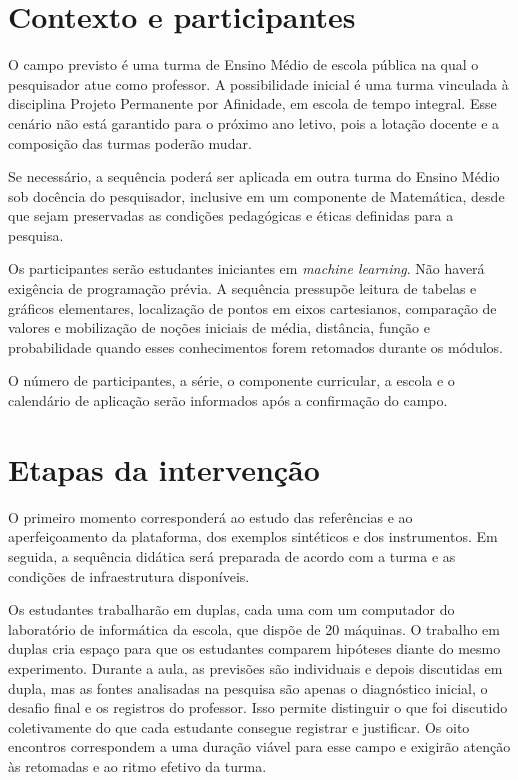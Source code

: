 \section{Contexto e participantes}

O campo previsto é uma turma de Ensino Médio de escola pública na qual o pesquisador atue como professor. A possibilidade inicial é uma turma vinculada à disciplina Projeto Permanente por Afinidade, em escola de tempo integral. Esse cenário não está garantido para o próximo ano letivo, pois a lotação docente e a composição das turmas poderão mudar.

Se necessário, a sequência poderá ser aplicada em outra turma do Ensino Médio sob docência do pesquisador, inclusive em um componente de Matemática, desde que sejam preservadas as condições pedagógicas e éticas definidas para a pesquisa.

Os participantes serão estudantes iniciantes em \textit{machine learning}. Não haverá exigência de programação prévia. A sequência pressupõe leitura de tabelas e gráficos elementares, localização de pontos em eixos cartesianos, comparação de valores e mobilização de noções iniciais de média, distância, função e probabilidade quando esses conhecimentos forem retomados durante os módulos.

O número de participantes, a série, o componente curricular, a escola e o calendário de aplicação serão informados após a confirmação do campo.

\section{Etapas da intervenção}

O primeiro momento corresponderá ao estudo das referências e ao aperfeiçoamento da plataforma, dos exemplos sintéticos e dos instrumentos. Em seguida, a sequência didática será preparada de acordo com a turma e as condições de infraestrutura disponíveis.

Os estudantes trabalharão em duplas, cada uma com um computador do laboratório de informática da escola, que dispõe de 20 máquinas. O trabalho em duplas cria espaço para que os estudantes comparem hipóteses diante do mesmo experimento. Durante a aula, as previsões são individuais e depois discutidas em dupla, mas as fontes analisadas na pesquisa são apenas o diagnóstico inicial, o desafio final e os registros do professor. Isso permite distinguir o que foi discutido coletivamente do que cada estudante consegue registrar e justificar. Os oito encontros correspondem a uma duração viável para esse campo e exigirão atenção às retomadas e ao ritmo efetivo da turma.

